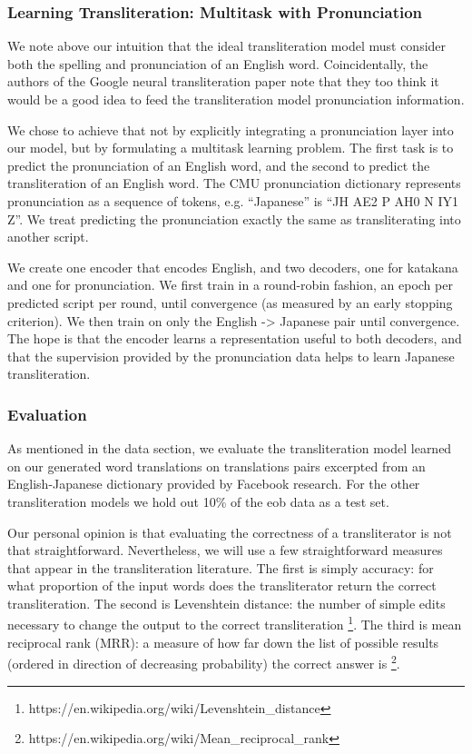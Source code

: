 \documentclass{article}
\begin{document}
\subsubsection*{Learning Transliteration: Multitask with Pronunciation}

We note above our intuition that the ideal transliteration model
must consider both the spelling and pronunciation of an English word.
Coincidentally,
the authors of the Google neural transliteration paper
\cite{Rosca2016SequencetosequenceNN}
note that they too think it would be a good idea
to feed the transliteration model pronunciation information.

We chose to achieve that not by
explicitly integrating a pronunciation layer into our model,
but by formulating a multitask learning problem.
The first task is to predict the pronunciation of an English word,
and the second to predict the transliteration of an English word.
The CMU pronunciation dictionary represents pronunciation
as a sequence of tokens,
e.g. ``Japanese'' is ``JH AE2 P AH0 N IY1 Z''.
We treat predicting the pronunciation exactly the same as
transliterating into another script.

We create one encoder that encodes English,
and two decoders, one for katakana and one for pronunciation.
We first train in a round-robin fashion,
an epoch per predicted script per round,
until convergence (as measured by an early stopping criterion).
We then train on only the English -> Japanese pair
until convergence.
The hope is that the encoder learns a representation useful to both decoders,
and that the supervision provided by the pronunciation data
helps to learn Japanese transliteration.

\subsubsection*{Evaluation}

As mentioned in the data section,
we evaluate the transliteration model learned on our generated word translations
on translations pairs excerpted from an English-Japanese dictionary
provided by Facebook research.
For the other transliteration models
we hold out 10\% of the eob data as a test set.

Our personal opinion is that evaluating the correctness
of a transliterator is not that straightforward.
Nevertheless,
we will use a few straightforward measures
that appear in the transliteration literature.
The first is simply accuracy:
for what proportion of the input words
does the transliterator return the correct transliteration.
The second is Levenshtein distance:
the number of simple edits necessary to change the output to
the correct transliteration
\footnote{https://en.wikipedia.org/wiki/Levenshtein\_distance}.
The third is mean reciprocal rank (MRR):
a measure of how far down the list of possible results
(ordered in direction of decreasing probability)
the correct answer is
\footnote{https://en.wikipedia.org/wiki/Mean\_reciprocal\_rank}.
\end{document}
